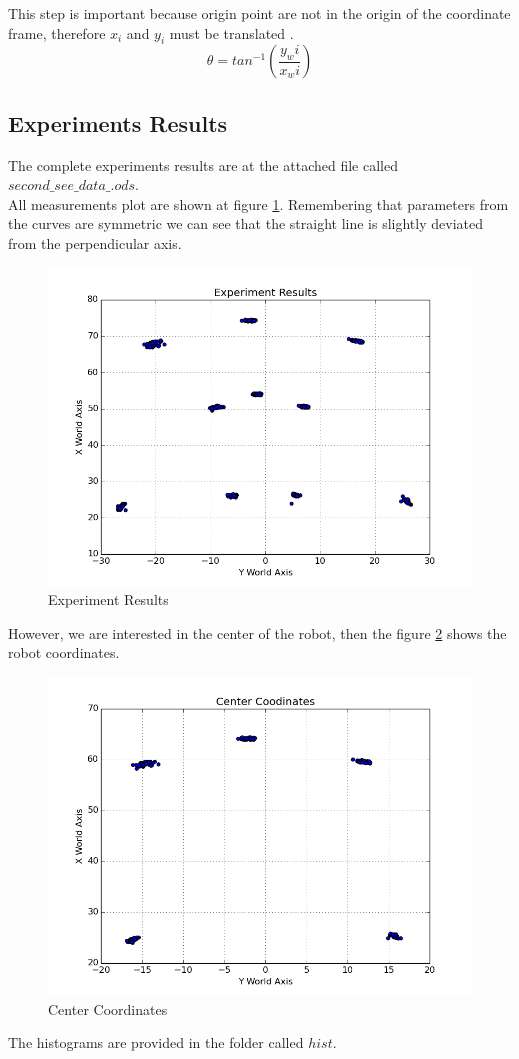 \documentclass[10pt]{scrartcl}
\begin{document}
\normalsize
This step is important because origin point are not in the origin of the coordinate frame, therefore $x_i$ and $y_i$ must be translated .
	\[
	\theta = tan^{-1}\left(\frac{y_wi}{x_wi}\right)
	\]

\subsection*{Experiments Results}

The complete experiments results are at the attached file called $second\_see \_data\_.ods$.\\

All measurements plot are shown at figure \ref{fig:10}. Remembering that parameters from the curves are symmetric we can see that the straight line is slightly deviated from the perpendicular axis.\\

\begin{figure}[h!]
\centering
\includegraphics[scale=0.70]{images/results}
\caption{Experiment Results}
\label{fig:10}
\end{figure}

However, we are interested in the center of the robot, then the figure \ref{fig:11} shows the robot coordinates.

\begin{figure}[h!]
\centering
\includegraphics[scale=0.70]{images/center}
\caption{Center Coordinates}
\label{fig:11}
\end{figure}

The histograms are provided in the folder called $hist$.
\end{document}
